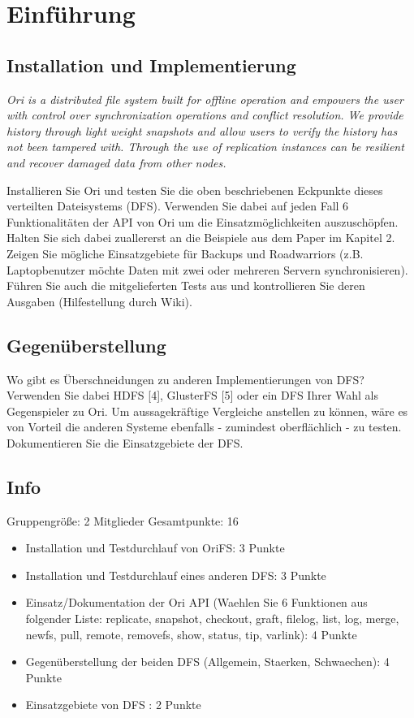 \section{Einführung}

\subsection{Installation und Implementierung}
\textit{Ori is a distributed file system built for offline operation and empowers the user with control over synchronization operations and conflict resolution. We provide history through light weight snapshots and allow users to verify the history has not been tampered with. Through the use of replication instances can be resilient and recover damaged data from other nodes.}

Installieren Sie Ori und testen Sie die oben beschriebenen Eckpunkte dieses verteilten Dateisystems (DFS). Verwenden Sie dabei auf jeden Fall 6 Funktionalitäten der API von Ori um die Einsatzmöglichkeiten auszuschöpfen. Halten Sie sich dabei zuallererst an die Beispiele aus dem Paper im Kapitel 2. Zeigen Sie mögliche Einsatzgebiete für Backups und Roadwarriors (z.B. Laptopbenutzer möchte Daten mit zwei oder mehreren Servern synchronisieren). Führen Sie auch die mitgelieferten Tests aus und kontrollieren Sie deren Ausgaben (Hilfestellung durch Wiki).

\subsection{Gegenüberstellung}
Wo gibt es Überschneidungen zu anderen Implementierungen von DFS?  Verwenden Sie dabei HDFS [4], GlusterFS [5] oder ein DFS Ihrer Wahl als Gegenspieler zu Ori. Um aussagekräftige Vergleiche anstellen zu können, wäre es von Vorteil die anderen Systeme ebenfalls - zumindest oberflächlich - zu testen. Dokumentieren Sie die Einsatzgebiete der DFS.

\subsection{Info}
Gruppengröße: 2 Mitglieder
Gesamtpunkte: 16

\begin{itemize}
    \itemsep0em
    \item Installation und Testdurchlauf von OriFS: 3 Punkte
    \item Installation und Testdurchlauf eines anderen DFS: 3 Punkte
    \item Einsatz/Dokumentation der Ori API (Waehlen Sie 6 Funktionen aus folgender Liste: replicate, snapshot, checkout, graft, filelog, list, log, merge, newfs, pull, remote, removefs, show, status, tip, varlink): 4 Punkte
    \item Gegenüberstellung der beiden DFS (Allgemein, Staerken, Schwaechen): 4 Punkte
    \item Einsatzgebiete von DFS : 2 Punkte
\end{itemize}


